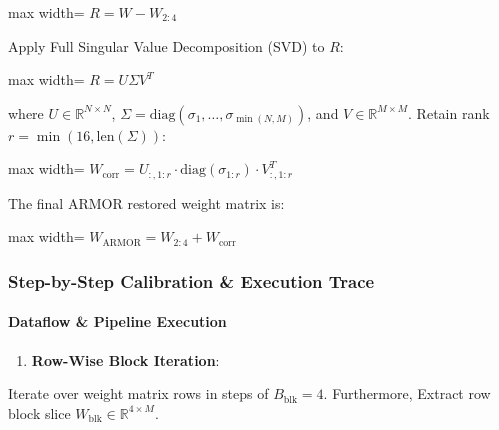 \begin{center}
\begin{adjustbox}{max width=\columnwidth}
$\displaystyle
R = W - W_{2:4}
$
\end{adjustbox}
\end{center}

Apply Full Singular Value Decomposition (SVD) to $R$:

\begin{center}
\begin{adjustbox}{max width=\columnwidth}
$\displaystyle
R = U \Sigma V^T
$
\end{adjustbox}
\end{center}

where $U \in \mathbb{R}^{N \times N}$, $\Sigma = \text{diag}(\sigma_1, \dots, \sigma_{\min(N, M)})$, and $V \in \mathbb{R}^{M \times M}$. Retain rank $r = \min(16, \text{len}(\Sigma))$:

\begin{center}
\begin{adjustbox}{max width=\columnwidth}
$\displaystyle
W_{\text{corr}} = U_{:, 1:r} \cdot \text{diag}(\sigma_{1:r}) \cdot V_{:, 1:r}^T
$
\end{adjustbox}
\end{center}

The final ARMOR restored weight matrix is:

\begin{center}
\begin{adjustbox}{max width=\columnwidth}
$\displaystyle
W_{\text{ARMOR}} = W_{2:4} + W_{\text{corr}}
$
\end{adjustbox}
\end{center}


\subsubsection*{Step-by-Step Calibration \& Execution Trace}

\paragraph{Dataflow \& Pipeline Execution}

\begin{enumerate}
\item \textbf{Row-Wise Block Iteration}:
\end{enumerate}
Iterate over weight matrix rows in steps of $B_{\text{blk}} = 4$. Furthermore, Extract row block slice $W_{\text{blk}} \in \mathbb{R}^{4 \times M}$.

